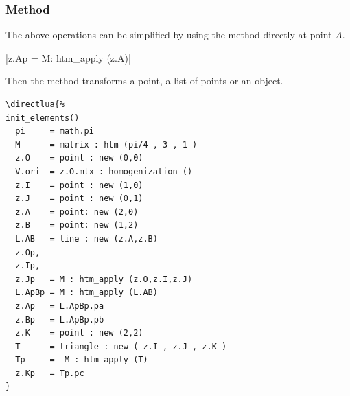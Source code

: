 \subsubsection{Method } %
\label{ssub:method_code_htm__apply}
The above operations can be simplified by using the  method directly at point $A$. 

\begin{mybox}
|z.Ap = M: htm_apply (z.A)|\\
\end{mybox}

Then the method  transforms a point, a list of points or an object.


\begin{minipage}{.6\textwidth}
\begin{Verbatim}
\directlua{%
init_elements()
  pi     = math.pi
  M      = matrix : htm (pi/4 , 3 , 1 )
  z.O    = point : new (0,0)
  V.ori  = z.O.mtx : homogenization ()
  z.I    = point : new (1,0)
  z.J    = point : new (0,1)
  z.A    = point: new (2,0)
  z.B    = point: new (1,2)
  L.AB   = line : new (z.A,z.B)
  z.Op,
  z.Ip,
  z.Jp   = M : htm_apply (z.O,z.I,z.J)
  L.ApBp = M : htm_apply (L.AB)
  z.Ap   = L.ApBp.pa
  z.Bp   = L.ApBp.pb
  z.K    = point : new (2,2)
  T      = triangle : new ( z.I , z.J , z.K )
  Tp     =  M : htm_apply (T)
  z.Kp   = Tp.pc
}
\end{Verbatim}
\end{minipage}
\begin{minipage}{.4\textwidth}
\end{minipage}

